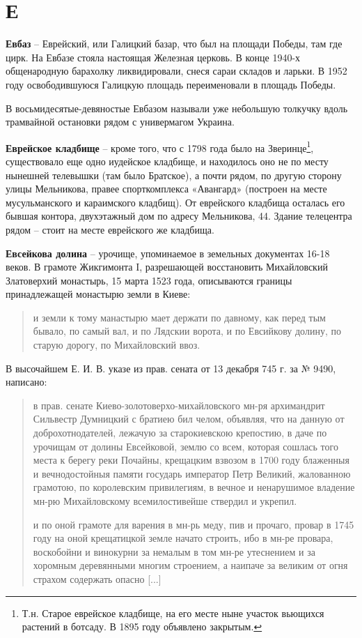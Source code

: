 \chapter*{Е}

\textbf{Евбаз} – Еврейский, или Галицкий базар, что был на площади Победы, там где цирк. На Евбазе стояла настоящая Железная церковь. В конце 1940-х общенародную барахолку ликвидировали, снеся сараи складов и ларьки. В 1952 году освободившуюся Галицкую площадь переименовали в площадь Победы.

В восьмидесятые-девяностые Евбазом называли уже небольшую толкучку вдоль трамвайной остановки рядом с универмагом Украина.\\

\medskip

\textbf{Еврейское кладбище} – кроме того, что с 1798 года было на Зверинце\footnote{Т.н. Старое еврейское кладбище, на его месте ныне участок вьющихся растений в ботсаду. В 1895 году объявлено закрытым.}, существовало еще одно иудейское кладбище, и находилось оно не по месту нынешней телевышки (там было Братское), а почти рядом, по другую сторону улицы Мельникова, правее спорткомплекса «Авангард» (построен на месте мусульманского и караимского кладбищ). От еврейского кладбища осталась его бывшая контора, двухэтажный дом по адресу Мельникова, 44. Здание телецентра рядом – стоит на месте еврейского же кладбища.\\

\medskip


\textbf{Евсейкова долина} – урочище, упоминаемое в земельных документах 16-18 веков. В грамоте Жикгимонта I, разрешающей восстановить Михайловский Златоверхий монастырь, 15 марта 1523 года, описываются границы принадлежащей монастырю земли в Киеве:

\begin{quotation}
и земли к тому манастырю мает держати по давному, как перед тым бывало, по самый вал, и по Лядскии ворота, и по Евсийкову долину, по старую дорогу, по Михайловский ввоз.
\end{quotation}

В высочайшем Е. И. В. указе из прав. сената от 13 декабря 745 г. за № 9490, написано: 

\begin{quotation}
в прав. сенате Киево-золотоверхо-михайловского мн-ря архимандрит Си\-львестр Думницкий с братиею бил челом, объявляя, что на данную от доброхотнодателей, лежачую за старокиевскою крепостию, в даче по урочищам от долины Евсейковой, землю со всем, которая сошлась того места к берегу реки Почайны, крещацким взвозом в 1700 году блаженныя и вечнодостойныя памяти государь император Петр Великий, жалованною грамотою, по королевским привилегиям, в вечное и ненарушимое владение мн-рю Михайловскому всемилостивейше ствердил и укрепил. 

и по оной грамоте для варения в мн-рь меду, пив и прочаго, провар в 1745 году на оной крещатицкой земле начато строить, ибо в мн-ре провара, воскобойни и винокурни за немалым в том мн-ре утеснением и за хоромным деревянными многим строением, а наипаче за великим от огня страхом содержать опасно [...]
\end{quotation}

